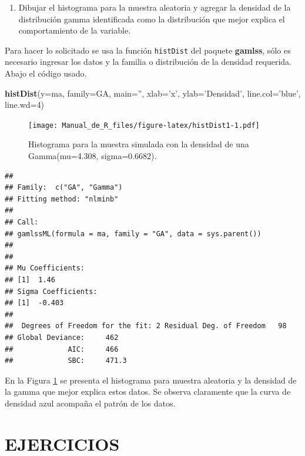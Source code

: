 \documentclass[10pt,]{krantz}
\makeatletter
\newenvironment{Shaded}{\begin{snugshade}}{\end{snugshade}}
\newcommand{\KeywordTok}[1]{\textcolor[rgb]{0.13,0.29,0.53}{\textbf{{#1}}}}
\newcommand{\DataTypeTok}[1]{\textcolor[rgb]{0.13,0.29,0.53}{{#1}}}
\newcommand{\DecValTok}[1]{\textcolor[rgb]{0.00,0.00,0.81}{{#1}}}
\newcommand{\StringTok}[1]{\textcolor[rgb]{0.31,0.60,0.02}{{#1}}}
\newcommand{\NormalTok}[1]{{#1}}
\providecommand{\tightlist}{%
  \setlength{\itemsep}{0pt}\setlength{\parskip}{0pt}}
\newenvironment{kframe}{%
\medskip{}
\setlength{\fboxsep}{.8em}
 \def\at@end@of@kframe{}%
 \ifinner\ifhmode%
  \def\at@end@of@kframe{\end{minipage}}%
  \begin{minipage}{\columnwidth}%
 \fi\fi%
 \def\FrameCommand##1{\hskip\@totalleftmargin \hskip-\fboxsep
 \colorbox{shadecolor}{##1}\hskip-\fboxsep
     \hskip-\linewidth \hskip-\@totalleftmargin \hskip\columnwidth}%
 \MakeFramed {\advance\hsize-\width
   \@totalleftmargin\z@ \linewidth\hsize
   \@setminipage}}%
 {\par\unskip\endMakeFramed%
 \at@end@of@kframe}
\renewenvironment{Shaded}{\begin{kframe}}{\end{kframe}}
\makeatother
\begin{document}
\begin{enumerate}
\def\labelenumi{\arabic{enumi})}
\setcounter{enumi}{2}
\tightlist
\item
  Dibujar el histograma para la muestra aleatoria y agregar la densidad
  de la distribución gamma identificada como la distribución que mejor
  explica el comportamiento de la variable.
\end{enumerate}

Para hacer lo solicitado se usa la función \texttt{histDist} del paquete
\textbf{gamlss}, sólo es necesario ingresar los datos y la familia o
distribución de la densidad requerida. Abajo el código usado.

\begin{Shaded}
\begin{Highlighting}[]
\KeywordTok{histDist}\NormalTok{(}\DataTypeTok{y=}\NormalTok{ma, }\DataTypeTok{family=}\NormalTok{GA, }\DataTypeTok{main=}\StringTok{''}\NormalTok{, }\DataTypeTok{xlab=}\StringTok{'x'}\NormalTok{, }\DataTypeTok{ylab=}\StringTok{'Densidad'}\NormalTok{,}
         \DataTypeTok{line.col=}\StringTok{'blue'}\NormalTok{, }\DataTypeTok{line.wd=}\DecValTok{4}\NormalTok{)}
\end{Highlighting}
\end{Shaded}

\begin{figure}[htbp]
\centering
\texttt{[image: Manual\_de\_R\_files/figure-latex/histDist1-1.pdf]}
\caption{\label{fig:histDist1}Histograma para la muestra simulada con la
densidad de una Gamma(mu=4.308, sigma=0.6682).}
\end{figure}

\begin{verbatim}
## 
## Family:  c("GA", "Gamma") 
## Fitting method: "nlminb" 
## 
## Call:  
## gamlssML(formula = ma, family = "GA", data = sys.parent()) 
## 
## 
## Mu Coefficients:
## [1]  1.46
## Sigma Coefficients:
## [1]  -0.403
## 
##  Degrees of Freedom for the fit: 2 Residual Deg. of Freedom   98 
## Global Deviance:     462 
##             AIC:     466 
##             SBC:     471.3
\end{verbatim}

En la Figura \ref{fig:histDist1} se presenta el histograma para muestra
aleatoria y la densidad de la gamma que mejor explica estos datos. Se
observa claramente que la curva de densidad azul acompaña el patrón de
los datos.

\section*{EJERCICIOS}\label{ejercicios-6}
\end{document}
